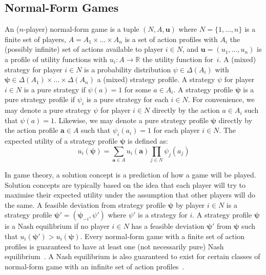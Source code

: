 \documentclass[10pt]{article}
\theoremstyle{plain}
\newcommand{\vect}[1]{\bm{#1}}
\begin{document}
\subsection{Normal-Form Games}
An ($n$-player) normal-form game is a tuple $(N, A, \vect{u})$ where $N = \{ 1, \dots, n \}$ is a finite set of players, $A = A_{1} \times \dots \times A_{n}$ is a set of action profiles with $A_{i}$ the (possibly infinite) set of actions available to player $i \in N$, and $\vect{u} = (u_{1}, \dots, u_{n})$ is a profile of utility functions with $u_{i} : A \to \mathbb{R}$ the utility function for~$i$.
A (mixed) strategy for player $i \in N$ is a probability distribution $\psi \in \Delta(A_{i})$ with $\vect{\psi} \in \Delta(A_{1}) \times \dots \times \Delta(A_{n})$ a (mixed) strategy profile.
A strategy $\psi$ for player $i \in N$ is a pure strategy if $\psi(a) = 1$ for some $a \in A_{i}$.
A strategy profile $\vect{\psi}$ is a pure strategy profile if $\psi_{i}$ is a pure strategy for each $i \in N$.
For convenience, we may denote a pure strategy $\psi$ for player $i \in N$ directly by the action $a \in A_{i}$ such that $\psi(a) = 1$.
Likewise, we may denote a pure strategy profile $\vect{\psi}$ directly by the action profile $\vect{a} \in A$ such that $\psi_{i}(a_{i}) = 1$ for each player $i \in N$.
The expected utility of a strategy profile $\vect{\psi}$ is defined as:
\begin{equation*}
	u_{i}(\vect{\psi}) = \sum_{\vect{a} \in A} u_{i}(\vect{a}) \prod_{j \in N} \psi_{j}(a_{j})
\end{equation*}

In game theory, a solution concept is a prediction of how a game will be played.
Solution concepts are typically based on the idea that each player will try to maximise their expected utility under the assumption that other players will do the same.
A feasible deviation from strategy profile $\vect{\psi}$ by player $i \in N$ is a strategy profile $\vect{\psi'} = (\vect{\psi}_{-i}, \psi')$ where $\psi'$ is a strategy for $i$.
A strategy profile $\vect{\psi}$ is a Nash equilibrium if no player $i \in N$ has a feasible deviation $\vect{\psi'}$ from $\vect{\psi}$ such that $u_{i}(\vect{\psi'}) > u_{i}(\vect{\psi})$.
Every normal-form game with a finite set of action profiles is guaranteed to have at least one (not necessarily pure) Nash equilibrium~\cite{Nash:AM:1951}.
A Nash equilibrium is also guaranteed to exist for certain classes of normal-form game with an infinite set of action profiles~\cite{}.
\end{document}
